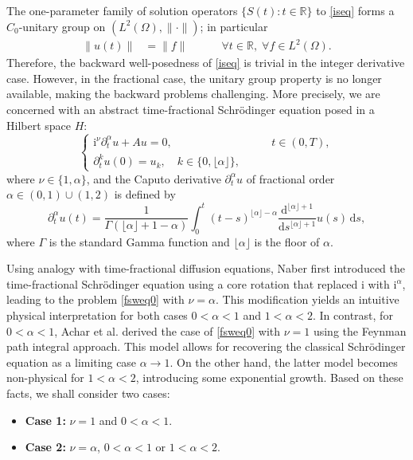 \documentclass[reqno]{amsart}
\numberwithin{equation}{section}
\def \d {\mathrm{d}}
\begin{document}
The one-parameter family of solution operators $\{S(t) : t \in \mathbb{R}\}$ to \eqref{iseq} forms a $C_0$-unitary group on $(L^2(\Omega),\|\cdot\|)$; in particular
\begin{align*}
\|u(t)\|&=\|f\| \quad\qquad \forall t\in \mathbb{R},\;\forall f\in L^2(\Omega).
\end{align*}
Therefore, the backward well-posedness of \eqref{iseq} is trivial in the integer derivative case. However, in the fractional case, the unitary group property is no longer available, making the backward problems challenging. More precisely, we are concerned with an abstract time-fractional Schrödinger equation posed in a Hilbert space $H$:
\begin{equation}\label{fsweq0}
\begin{cases}
\mathrm{i}^{\nu}\partial_t^\alpha u +Au=0, &\qquad t \in (0,T),\\
\partial_t^k u(0)=u_k, \quad k\in \{0, \lfloor\alpha\rfloor\},
\end{cases}
\end{equation}
where $\nu\in \{1,\alpha\}$, and the Caputo derivative $\partial_t^\alpha u$ of fractional order $\alpha \in (0,1)\cup (1,2)$ is defined by
$$\partial_t^{\alpha} u(t) = \frac{1}{\Gamma(\lfloor\alpha\rfloor+1-\alpha)} \int^t_0 (t-s)^{\lfloor\alpha\rfloor-\alpha} \frac{\d^{\lfloor\alpha\rfloor+1} }{\d s^{\lfloor\alpha\rfloor+1}}u(s) \, \d s,$$
where $\Gamma$ is the standard Gamma function and $\lfloor\alpha\rfloor$ is the floor of $\alpha$.

Using analogy with time-fractional diffusion equations, Naber first introduced the time-fractional Schrödinger equation \cite{Na04} using a core rotation that replaced $\mathrm{i}$ with $\mathrm{i}^\alpha$, leading to the problem \eqref{fsweq0} with $\nu = \alpha$. This modification yields an intuitive physical interpretation for both cases $0<\alpha<1$ and $1<\alpha<2$. In contrast, for $0 < \alpha < 1$, Achar et al. \cite{Ach13} derived the case of \eqref{fsweq0} with $\nu = 1$ using the Feynman path integral approach. This model allows for recovering the classical Schrödinger equation as a limiting case $\alpha\to 1$. On the other hand, the latter model becomes non-physical for $1 < \alpha < 2$, introducing some exponential growth. Based on these facts, we shall consider two cases:
\begin{itemize}
    \item \textbf{Case 1:} $\nu=1$ and $0<\alpha<1$.
    \item \textbf{Case 2:} $\nu=\alpha$, $0<\alpha<1$ or $1<\alpha<2$.
\end{itemize}
\end{document}
